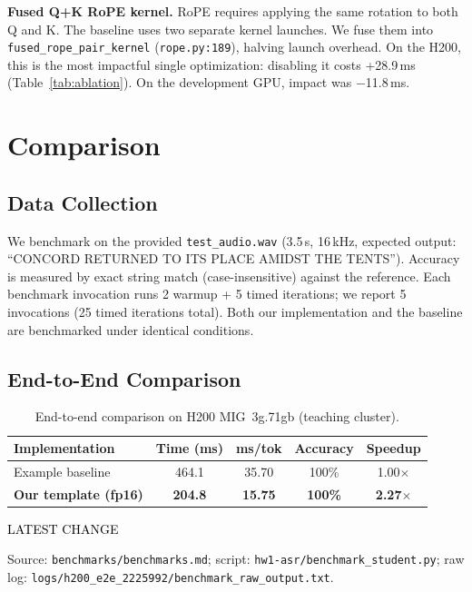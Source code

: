 \documentclass{article}
\newcommand{\latestchglabel}{{\setlength{\fboxsep}{1pt}\colorbox{yellow!65}{\textcolor{black}{\scriptsize LATEST CHANGE}}}}
\newcommand{\latestsource}[1]{%
  \par\noindent
  {\footnotesize \latestchglabel\ \parbox[t]{0.9\linewidth}{#1}}\par
}
\begin{document}
\textbf{Fused Q+K RoPE kernel.}
RoPE requires applying the same rotation to both Q and K.  The baseline uses two separate kernel launches. We fuse them into \texttt{fused\_rope\_pair\_kernel} (\texttt{rope.py:189}), halving launch overhead.  On the H200, this is the most impactful single optimization: disabling it costs +28.9\,ms (Table~\ref{tab:ablation}). On the development GPU, impact was $-$11.8\,ms.


\section{Comparison}\label{sec:comparison}

\subsection{Data Collection}

We benchmark on the provided \texttt{test\_audio.wav} (3.5\,s, 16\,kHz, expected output: ``CONCORD RETURNED TO ITS PLACE AMIDST THE TENTS'').  Accuracy is measured by exact string match (case-insensitive) against the reference.  Each benchmark invocation runs 2 warmup + 5 timed iterations; we report 5 invocations (25 timed iterations total).  Both our implementation and the baseline are benchmarked under identical conditions.

\subsection{End-to-End Comparison}

\begin{table}[h]
\centering
\caption{End-to-end comparison on H200 MIG~3g.71gb (teaching cluster).}
\label{tab:comparison}
\small
\begin{tabular}{@{}lcccc@{}}
\toprule
\textbf{Implementation} & \textbf{Time (ms)} & \textbf{ms/tok} & \textbf{Accuracy} & \textbf{Speedup} \\
\midrule
Example baseline & 464.1 & 35.70 & 100\% & 1.00$\times$ \\
\textbf{Our template (fp16)} & \textbf{204.8} & \textbf{15.75} & \textbf{100\%} & \textbf{2.27$\times$} \\
\bottomrule
\end{tabular}
\end{table}

\latestsource{Source: \texttt{benchmarks/benchmarks.md}; script: \texttt{hw1-asr/benchmark\_student.py}; raw log: \texttt{logs/h200\_e2e\_2225992/benchmark\_raw\_output.txt}.}
\end{document}
